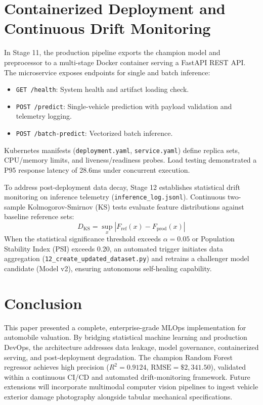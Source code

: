 \documentclass[conference]{IEEEtran}
\begin{document}
\section{Containerized Deployment and Continuous Drift Monitoring}
In Stage 11, the production pipeline exports the champion model and preprocessor to a multi-stage Docker container serving a FastAPI REST API. The microservice exposes endpoints for single and batch inference:
\begin{itemize}
    \item \texttt{GET /health}: System health and artifact loading check.
    \item \texttt{POST /predict}: Single-vehicle prediction with payload validation and telemetry logging.
    \item \texttt{POST /batch-predict}: Vectorized batch inference.
\end{itemize}
Kubernetes manifests (\texttt{deployment.yaml}, \texttt{service.yaml}) define replica sets, CPU/memory limits, and liveness/readiness probes. Load testing demonstrated a P95 response latency of 28.6ms under concurrent execution.

To address post-deployment data decay, Stage 12 establishes statistical drift monitoring on inference telemetry (\texttt{inference\_log.jsonl}). Continuous two-sample Kolmogorov-Smirnov (KS) tests \cite{massey1951kolmogorov} evaluate feature distributions against baseline reference sets:
\begin{equation}
D_{\text{KS}} = \sup_{x} |F_{\text{ref}}(x) - F_{\text{prod}}(x)|
\end{equation}
When the statistical significance threshold exceeds $\alpha = 0.05$ or Population Stability Index ($\text{PSI}$) exceeds 0.20, an automated trigger initiates data aggregation (\texttt{12\_create\_updated\_dataset.py}) and retrains a challenger model candidate (Model v2), ensuring autonomous self-healing capability.

\section{Conclusion}
This paper presented a complete, enterprise-grade MLOps implementation for automobile valuation. By bridging statistical machine learning and production DevOps, the architecture addresses data leakage, model governance, containerized serving, and post-deployment degradation. The champion Random Forest regressor achieves high precision ($R^2 = 0.9124$, $\text{RMSE} = \$2,341.50$), validated within a continuous CI/CD and automated drift-monitoring framework. Future extensions will incorporate multimodal computer vision pipelines to ingest vehicle exterior damage photography alongside tabular mechanical specifications.



\end{document}
